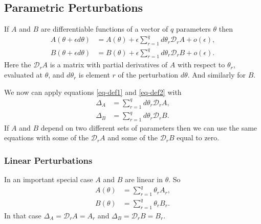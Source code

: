 \documentclass[
  12pt,
  letterpaper,
  DIV=11,
  numbers=noendperiod]{scrartcl}
\begin{document}
\subsection{Parametric Perturbations}\label{sec-parametric}

If \(A\) and \(B\) are differentiable functions of a vector of \(q\)
parameters \(\theta\) then \begin{subequations}
\begin{align}
A(\theta+\epsilon d\theta)&=A(\theta)+\epsilon\sum_{r=1}^q d\theta_r\mathcal{D}_rA+o(\epsilon),\label{eq-par1}\\
B(\theta+\epsilon d\theta)&=B(\theta)+\epsilon\sum_{r=1}^q d\theta_r\mathcal{D}_rB+o(\epsilon).\label{eq-par2}
\end{align}
\end{subequations} Here the \(\mathcal{D}_rA\) is a matrix with partial
derivatives of \(A\) with respect to \(\theta_r\), evaluated at
\(\theta\), and \(d\theta_r\) is element \(r\) of the perturbation
\(d\theta\). And similarly for \(B\).

We now can apply equations \eqref{eq-def1} and \eqref{eq-def2} with
\begin{subequations}
\begin{align}
\Delta_A&=\sum_{r=1}^qd\theta_r\mathcal{D}_rA,\label{eq-par3}\\
\Delta_B&=\sum_{r=1}^qd\theta_r\mathcal{D}_rB.\label{eq-par4}
\end{align}
\end{subequations} If \(A\) and \(B\) depend on two different sets of
parameters then we can use the same equations with some of the
\(\mathcal{D}_rA\) and some of the \(\mathcal{D}_rB\) equal to zero.

\subsubsection{Linear Perturbations}\label{sec-perlinear}

In an important special case \(A\) and \(B\) are linear in \(\theta\).
So \begin{subequations}
\begin{align}
A(\theta)&=\sum_{r=1}^q\theta_r A_r,\label{eq-linpar1}\\
B(\theta)&=\sum_{r=1}^q\theta_r B_r.\label{eq-linpar2}
\end{align}
\end{subequations} In that case \(\Delta_A=\mathcal{D}_rA=A_r\) and
\(\Delta_B=\mathcal{D}_rB=B_r\).
\end{document}
